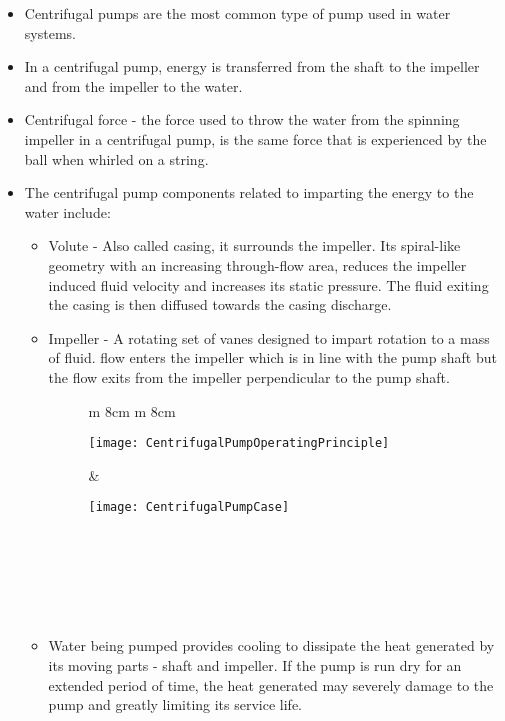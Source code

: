 \begin{itemize}
\item Centrifugal pumps are the most common type of pump used in water systems. 

\item In a centrifugal pump, energy is transferred from the shaft to the impeller and from the impeller to the water.

\item Centrifugal force - the force used to throw the water from the spinning impeller in a centrifugal pump, is the same force that is experienced by the ball when whirled on a string.

\item The centrifugal pump components related to imparting the energy to the water include:

\begin{itemize} 
\item Volute - Also called casing, it surrounds the impeller.  Its spiral-like geometry with an increasing through-flow area, reduces the impeller induced fluid velocity and increases its static pressure. The fluid exiting the casing is then diffused towards the casing discharge.

\item Impeller - A rotating set of vanes designed to impart rotation to a mass of fluid.  flow enters the impeller which is in line with the pump shaft but the flow exits from the impeller perpendicular to the pump shaft.

\begin{figure}[h!]
\begin{tabular}{  m {8cm}  m {8cm}} 
\begin{center} \texttt{[image: CentrifugalPumpOperatingPrinciple]} \end{center} & \begin{center}\texttt{[image: CentrifugalPumpCase]} \end{center} \\
                                                                \\\\
\end{tabular}\\
\end{figure}
\item Water being pumped provides cooling to dissipate the heat generated by its moving parts - shaft and impeller.  If the pump is run dry for an extended period of time, the heat generated may severely damage to the pump and greatly limiting its service life.
\end{itemize}

\end{itemize}
